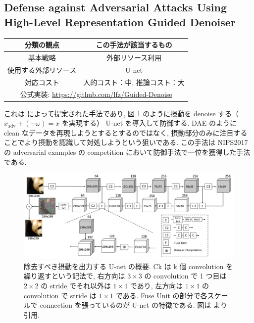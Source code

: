 \subsection{Defense against Adversarial Attacks Using High-Level Representation Guided Denoiser}
\label{subsec:defense-against}
%
\begin{table}[htbp]
\begin{center}
\begin{tabular}{|c|c|}
\hline
分類の観点 & この手法が該当するもの \\
\hline
基本戦略 & 外部リソース利用 \\
使用する外部リソース & U-net \\
対応コスト & 人的コスト：中, 推論コスト：大 \\
\hline
\multicolumn{2}{|c|}{公式実装: \href{https://github.com/lfz/Guided-Denoise}{https://github.com/lfz/Guided-Denoise}} \\
\hline
\end{tabular}
\label{tb:defense-against-summary}
\end{center}
\end{table}
%

これは \cite{liao2018defense} によって提案された手法であり, 図 \ref{fig:defense-against-summary} のように摂動を denoise する（$x_{\text{adv}} + (- \omega) = x$ を実現する） U-net \cite{ronneberger2015u} を導入して防御する.
DAE のように clean なデータを再現しようとするとするのではなく, 摂動部分のみに注目することでより摂動を認識して対処しようという狙いである.
この手法は NIPS2017 の adversarial examples の competition において防御手法で一位を獲得した手法である.
%
\begin{figure}[htbp]
\begin{center}
\includegraphics[width=14.0cm]{figures/defense-against-summary.pdf}
\end{center}
\caption{
除去すべき摂動を出力する U-net の概要.
Ck は k 個 convolution を繰り返すという記法で, 右方向は $3 \times 3$ の convolution で 1 つ目は $2 \times 2$ の stride でそれ以外は $1 \times 1$ であり, 左方向は $1 \times 1$ の convolution で stride は $1 \times 1$ である.
Fuse Unit の部分で各スケールで connection を張っているのが U-net の特徴である.
図は \cite{liao2018defense} より引用.}
\label{fig:defense-against-summary}
\end{figure}

